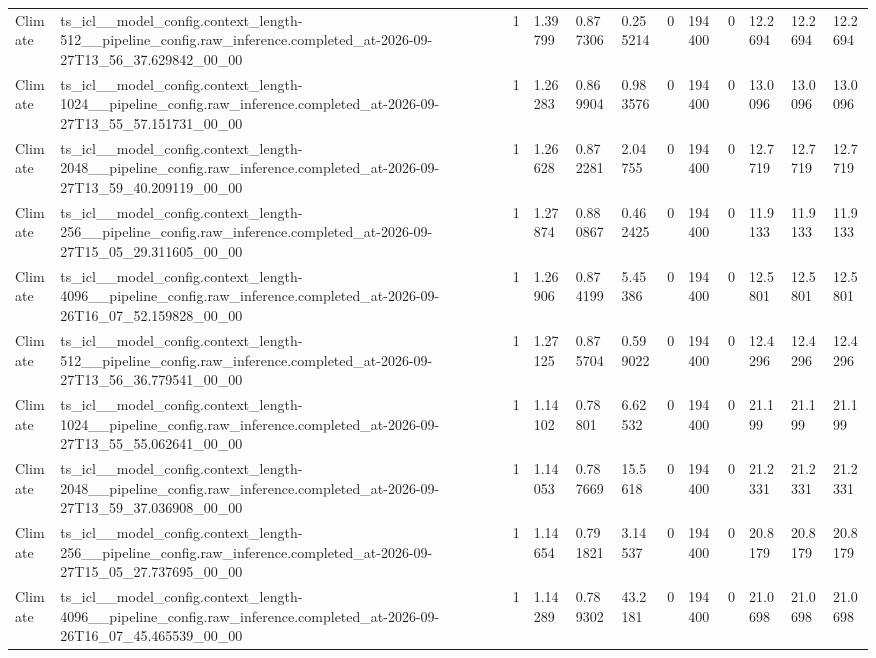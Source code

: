 \begin{tabular}{llllllllllll}
Climate & ts\_icl\_\_model\_config.context\_length-512\_\_pipeline\_config.raw\_inference.completed\_at-2026-09-27T13\_56\_37.629842\_00\_00 & 1 & 1.39799 & 0.877306 & 0.255214 & 0 & 194400 & 0 & 12.2694 & 12.2694 & 12.2694 \\
Climate & ts\_icl\_\_model\_config.context\_length-1024\_\_pipeline\_config.raw\_inference.completed\_at-2026-09-27T13\_55\_57.151731\_00\_00 & 1 & 1.26283 & 0.869904 & 0.983576 & 0 & 194400 & 0 & 13.0096 & 13.0096 & 13.0096 \\
Climate & ts\_icl\_\_model\_config.context\_length-2048\_\_pipeline\_config.raw\_inference.completed\_at-2026-09-27T13\_59\_40.209119\_00\_00 & 1 & 1.26628 & 0.872281 & 2.04755 & 0 & 194400 & 0 & 12.7719 & 12.7719 & 12.7719 \\
Climate & ts\_icl\_\_model\_config.context\_length-256\_\_pipeline\_config.raw\_inference.completed\_at-2026-09-27T15\_05\_29.311605\_00\_00 & 1 & 1.27874 & 0.880867 & 0.462425 & 0 & 194400 & 0 & 11.9133 & 11.9133 & 11.9133 \\
Climate & ts\_icl\_\_model\_config.context\_length-4096\_\_pipeline\_config.raw\_inference.completed\_at-2026-09-26T16\_07\_52.159828\_00\_00 & 1 & 1.26906 & 0.874199 & 5.45386 & 0 & 194400 & 0 & 12.5801 & 12.5801 & 12.5801 \\
Climate & ts\_icl\_\_model\_config.context\_length-512\_\_pipeline\_config.raw\_inference.completed\_at-2026-09-27T13\_56\_36.779541\_00\_00 & 1 & 1.27125 & 0.875704 & 0.599022 & 0 & 194400 & 0 & 12.4296 & 12.4296 & 12.4296 \\
Climate & ts\_icl\_\_model\_config.context\_length-1024\_\_pipeline\_config.raw\_inference.completed\_at-2026-09-27T13\_55\_55.062641\_00\_00 & 1 & 1.14102 & 0.78801 & 6.62532 & 0 & 194400 & 0 & 21.199 & 21.199 & 21.199 \\
Climate & ts\_icl\_\_model\_config.context\_length-2048\_\_pipeline\_config.raw\_inference.completed\_at-2026-09-27T13\_59\_37.036908\_00\_00 & 1 & 1.14053 & 0.787669 & 15.5618 & 0 & 194400 & 0 & 21.2331 & 21.2331 & 21.2331 \\
Climate & ts\_icl\_\_model\_config.context\_length-256\_\_pipeline\_config.raw\_inference.completed\_at-2026-09-27T15\_05\_27.737695\_00\_00 & 1 & 1.14654 & 0.791821 & 3.14537 & 0 & 194400 & 0 & 20.8179 & 20.8179 & 20.8179 \\
Climate & ts\_icl\_\_model\_config.context\_length-4096\_\_pipeline\_config.raw\_inference.completed\_at-2026-09-26T16\_07\_45.465539\_00\_00 & 1 & 1.14289 & 0.789302 & 43.2181 & 0 & 194400 & 0 & 21.0698 & 21.0698 & 21.0698 \\

\end{tabular}
